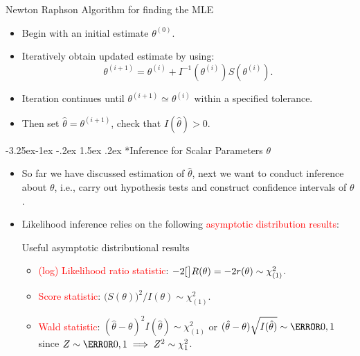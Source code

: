 \documentclass[final]{article}\usepackage[]{graphicx}\usepackage[svgnames]{xcolor}
\makeatletter
\renewcommand\subsection{\@startsection{subsection}{2}{\z@}%
                                     {-3.25ex\@plus -1ex \@minus -.2ex}%
                                     {1.5ex \@plus .2ex}%
                                     {\normalfont\large\bfseries\scshape\color{Blue}}}
\let\log\relax%
\makeatother
\begin{document}
\begin{Regular}{Newton Raphson Algorithm for finding the MLE}
      \begin{itemize}
            \item Begin with an initial estimate $ \theta^{(0)} $.
            \item Iteratively obtain updated estimate by using:
                  \[ \theta^{(i+1)}=\theta^{(i)}+I^{-1}(\theta^{(i)})S(\theta^{(i)}). \]
            \item Iteration continues until $ \theta^{(i+1)}\simeq \theta^{(i)} $ within a specified tolerance.
            \item Then set $ \hat{\theta}=\theta^{(i+1)} $, check that $ I(\hat{\theta})>0 $.
      \end{itemize}
\end{Regular}
\subsection*{Inference for Scalar Parameters $ \theta $}
\begin{itemize}
      \item So far we have discussed estimation of $ \hat{\theta} $, next we want to conduct inference
            about $ \theta $, i.e., carry out hypothesis tests and construct confidence intervals of $ \theta $.
      \item Likelihood inference relies on the following \textcolor{Red}{asymptotic distribution results}:
            \begin{Regular}{Useful asymptotic distributional results}
                  \begin{itemize}
                        \item \textcolor{Red}{(log) Likelihood ratio statistic}: $ -2\log[\big]{R(\theta)}=-2r(\theta)\sim \chi^2_{(1)} $.
                        \item \textcolor{Red}{Score statistic}: $ \bigl(S(\theta)\bigr)^2/I(\theta)\sim \chi^2_{(1)} $.
                        \item \textcolor{Red}{Wald statistic}: $ (\hat{\theta}-\theta)^2 I(\hat{\theta}) \sim \chi^2_{(1)} $ or $ (\hat{\theta}-\theta)\sqrt{I(\hat{\theta})}\sim \N{0,1} $
                              since $ Z \sim \N{0,1} \implies Z^2 \sim \chi^2_{1} $.
                  \end{itemize}
            \end{Regular}
\end{itemize}
\end{document}
